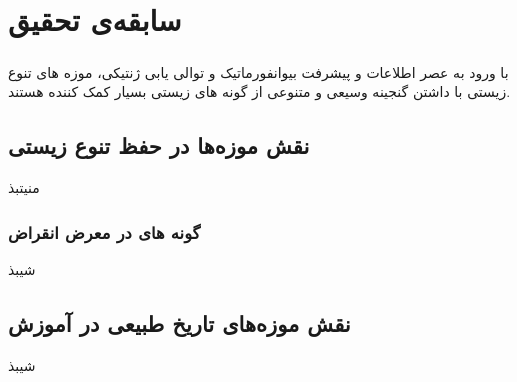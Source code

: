 
\chapter{سابقه‌ی تحقیق} \label{chapter:related-works}

\paragraph*{}

با ورود به عصر اطلاعات و پیشرفت بیوانفورماتیک و توالی یابی ژنتیکی، موزه های تنوع زیستی با داشتن گنجینه وسیعی و متنوعی از گونه های زیستی بسیار کمک کننده هستند.

\section{نقش موزه‌ها در حفظ تنوع زیستی}
منیتبذ
\subsection{گونه های در معرض انقراض}
شیبذ

\section{نقش موزه‌های تاریخ طبیعی در آموزش}
شیبذ

